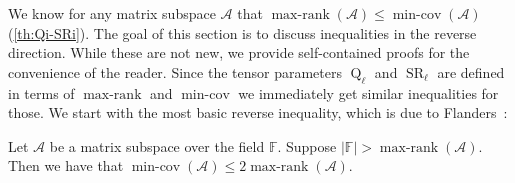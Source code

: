\documentclass{daj}
\DeclareMathOperator{\subrank}{Q}
\DeclareMathOperator{\slicerank}{SR}
\newcommand{\FF}{\mathbb{F}}
\DeclareMathOperator{\linspan}{span}
\DeclareMathOperator{\rank}{rank} \DeclareMathOperator{\col}{colspan}
\DeclareMathOperator{\maxrank}{max-rank}
\DeclareMathOperator{\mincov}{min-cov}
\newcommand{\id}{\mathrm{Id}}
\begin{document}
%
%

We know for any matrix subspace $\mathcal{A}$ that $\maxrank(\mathcal{A}) \leq \mincov(\mathcal{A})$ %
(\autoref{th:Qi-SRi}). The goal of this section is to discuss inequalities in the reverse direction. While these are not new, we provide self-contained proofs for the convenience of the reader. Since the tensor parameters $\subrank_\ell$ and $\slicerank_\ell$ are defined in terms of $\maxrank$ and $\mincov$ we immediately get similar inequalities for those. We start with the most basic reverse inequality, which is %
due to Flanders~\cite{flanders1962spaces}:

\begin{lemma}\label{th:sr-q-2-matrix} %
    Let $\mathcal{A}$ be a matrix subspace over the field $\FF$.
    Suppose $|\FF| > \maxrank(\mathcal{A})$. Then we have that $\mincov(\mathcal{A}) \leq 2 \maxrank(\mathcal{A})$.
\end{lemma}

%

\end{document}
